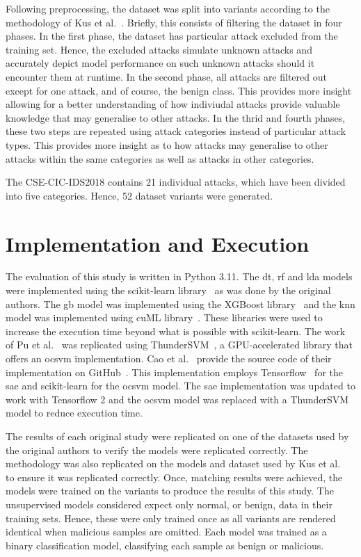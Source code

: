 Following preprocessing, the dataset was split into variants according to the
methodology of Kus et al.~\cite{Kus}. Briefly, this consists of filtering the
dataset in four phases. In the first phase, the dataset has particular attack
excluded from the training set. Hence, the excluded attacks simulate unknown
attacks and accurately depict model performance on such unknown attacks should
it encounter them at runtime. In the second phase, all attacks are filtered out
except for one attack, and of course, the benign class. This provides more
insight allowing for a better understanding of how indiviudal attacks provide
valuable knowledge that may generalise to other attacks. In the thrid and
fourth phases, these two steps are repeated using attack categories instead of
particular attack types. This provides more insight as to how attacks may
generalise to other attacks within the same categories as well as attacks in
other categories.

The CSE-CIC-IDS2018 contains 21 individual attacks, which have been divided
into five categories. Hence, 52 dataset variants were generated.

\section{Implementation and Execution}%
\label{sec:implementation}

The evaluation of this study is written in Python 3.11. The \gls{dt}, \gls{rf}
and \gls{lda} models were implemented using the scikit-learn
library~\cite{scikit-learn} as was done by the original authors. The \gls{gb}
model was implemented using the XGBoost library~\cite{xgboost} and the
\gls{knn} model was implemented using cuML library~\cite{cuml}. These libraries
were used to increase the execution time beyond what is possible with
scikit-learn. The work of Pu et al.~\cite{Pu} was replicated using
ThunderSVM~\cite{ThunderSVM}, a GPU-accelerated library that offers an
\gls{ocsvm} implementation. Cao et al.~\cite{Cao} provide the source code of
their implementation on GitHub~\cite{cao_git}. This implementation employs
Tensorflow~\cite{tensorflow} for the \gls{sae} and scikit-learn for the
\gls{ocsvm} model. The \gls{sae} implementation was updated to work with
Tensorflow 2 and the \gls{ocsvm} model was replaced with a
ThunderSVM~\cite{ThunderSVM} model to reduce execution time.

The results of each original study were replicated on one of the datasets used
by the original authors to verify the models were replicated correctly. The
methodology was also replicated on the models and dataset used by Kus et
al.~\cite{Kus} to ensure it was replicated correctly. Once, matching results
were achieved, the models were trained on the variants to produce the results
of this study. The unsupervised models considered expect only normal, or
benign, data in their training sets. Hence, these were only trained once as all
variants are rendered identical when malicious samples are omitted. Each model
was trained as a binary classification model, classifying each sample as benign
or malicious.

